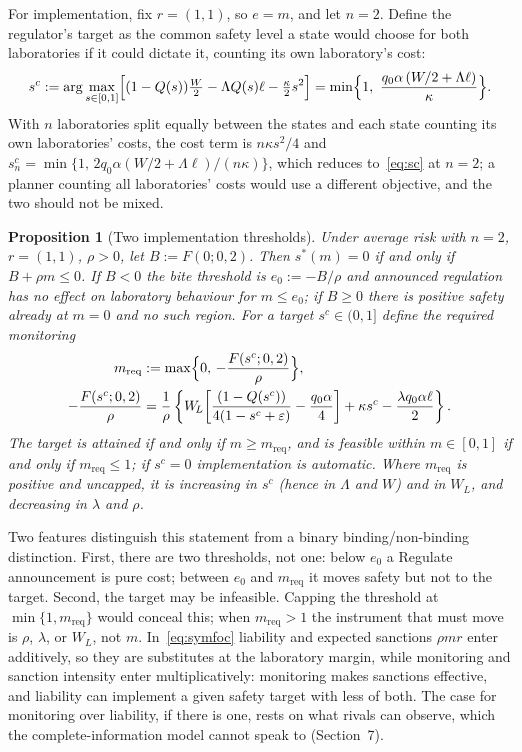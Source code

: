 \documentclass[11pt]{article}
\theoremstyle{plain}
\newtheorem{proposition}{Proposition}
\theoremstyle{definition}
\theoremstyle{remark}
\newcommand{\Lam}{\Lambda}
\newcommand{\WL}{W_{\!L}}
\begin{document}
For implementation, fix $r=(1,1)$, so $e=m$, and let $n=2$. Define the regulator's target as the common safety level a state would choose for both laboratories if it could dictate it, counting its own laboratory's cost:
\begin{equation}
s^c:=\arg\max_{s\in[0,1]}\Bigl[(1-Q(s))\tfrac{W}{2}-\Lam Q(s)\ell-\tfrac{\kappa}{2}s^2\Bigr]
=\min\Bigl\{1,\ \frac{q_0\alpha\,(W/2+\Lam\ell)}{\kappa}\Bigr\}.
\label{eq:sc}
\end{equation}
With $n$ laboratories split equally between the states and each state counting its own laboratories' costs, the cost term is $n\kappa s^2/4$ and $s^c_n=\min\{1,\,2q_0\alpha(W/2+\Lam\ell)/(n\kappa)\}$, which reduces to~\eqref{eq:sc} at $n=2$; a planner counting all laboratories' costs would use a different objective, and the two should not be mixed.

\begin{proposition}[Two implementation thresholds]
Under average risk with $n=2$, $r=(1,1)$, $\rho>0$, let $B:=F(0;0,2)$. Then $s^*(m)=0$ if and only if $B+\rho m\le0$. If $B<0$ the bite threshold is $e_0:=-B/\rho$ and announced regulation has no effect on laboratory behaviour for $m\le e_0$; if $B\ge0$ there is positive safety already at $m=0$ and no such region. For a target $s^c\in(0,1]$ define the required monitoring
\begin{align}
m_{\mathrm{req}}&:=\max\Bigl\{0,\,-\frac{F(s^c;0,2)}{\rho}\Bigr\},\notag\\
-\frac{F(s^c;0,2)}{\rho}&=\frac{1}{\rho}\left\{\WL\!\left[\frac{(1-Q(s^c))}{4(1-s^c+\varepsilon)}-\frac{q_0\alpha}{4}\right]+\kappa s^c-\frac{\lambda q_0\alpha\ell}{2}\right\}.
\label{eq:ebar}
\end{align}
The target is attained if and only if $m\ge m_{\mathrm{req}}$, and is feasible within $m\in[0,1]$ if and only if $m_{\mathrm{req}}\le1$; if $s^c=0$ implementation is automatic. Where $m_{\mathrm{req}}$ is positive and uncapped, it is increasing in $s^c$ (hence in $\Lam$ and $W$) and in $\WL$, and decreasing in $\lambda$ and $\rho$.
\end{proposition}

Two features distinguish this statement from a binary binding/non-binding distinction. First, there are two thresholds, not one: below $e_0$ a Regulate announcement is pure cost; between $e_0$ and $m_{\mathrm{req}}$ it moves safety but not to the target. Second, the target may be infeasible. Capping the threshold at $\min\{1,m_{\mathrm{req}}\}$ would conceal this; when $m_{\mathrm{req}}>1$ the instrument that must move is $\rho$, $\lambda$, or $\WL$, not $m$. In~\eqref{eq:symfoc} liability and expected sanctions $\rho m r$ enter additively, so they are substitutes at the laboratory margin, while monitoring and sanction intensity enter multiplicatively: monitoring makes sanctions effective, and liability can implement a given safety target with less of both. The case for monitoring over liability, if there is one, rests on what rivals can observe, which the complete-information model cannot speak to (Section~7).
\end{document}
